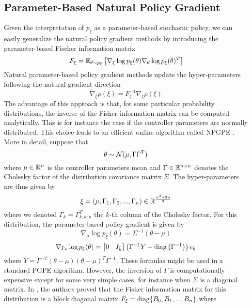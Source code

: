\subsection{Parameter-Based Natural Policy Gradient}
Given the interpretation of $p_\xi$ as a parameter-based stochastic policy, we can easily generalize the natural policy gradient methods by introducing the parameter-based Fischer information matrix
\begin{equation}
	F_\xi = \E[\theta\sim p_\xi]{\nabla_\xi\log p_\xi(\theta) \nabla_\theta\log p_\xi(\theta)^T}
\end{equation}
Natural parameter-based policy gradient methods update the hyper-parameters following the natural gradient direction 
\begin{equation}
	\widetilde{\nabla}_\xi \rho(\xi) = F_\xi^{-1} \nabla_\xi \rho(\xi)
\end{equation}
The advantage of this approach is that, for some particular probability distributions, the inverse of the Fisher information matrix can be computed analytically. This is for instance the case if the controller parameters are normally distributed. This choice leads to an efficient online algorithm called \gls{NPGPE} \cite{miyamae2010natural}. More in detail, suppose that
\begin{equation*}
	\theta \sim \calN(\mu, \Gamma \Gamma^T)
\end{equation*} 
where $\mu\in\R^n$ is the controller parameters mean and $\Gamma \in \R^{n\times n}$ denotes the Cholesky factor of the distribution covariance matrix $\Sigma$. The hyper-parameters are thus given by 
\begin{equation*}
	\xi = (\mu, \Gamma_1, \Gamma_2, ... , \Gamma_n) \in \R^\frac{n^2 + 3n}{2}
\end{equation*}
where we denoted $\Gamma_k = \Gamma_{k,k:n}^T$ the $k$-th column of the Cholesky factor. For this distribution, the parameter-based policy gradient is given by
\begin{equation}
	\nabla_\mu \log p_\xi(\theta) = \Sigma^{-1} (\theta - \mu)
\end{equation}
\begin{equation}
	\nabla_{\Gamma_k} \log p_\xi(\theta) = \begin{bmatrix} 0 & I_{\bar{k}} \end{bmatrix} \left(\Gamma^{-1} Y - \diag\left(\Gamma^{-1}\right)\right) e_k
\end{equation}
where $Y = \Gamma^{-T} (\theta - \mu) (\theta - \mu)^T \Gamma^{-1}$. These formulas might be used in a standard PGPE algorithm. However, the inversion of $\Gamma$ is computationally expensive except for some very simple cases, for instance when $\Sigma$ is a diagonal matrix. In \cite{sun2009efficient}, the authors proved that the Fisher information matrix for this distribution is a block diagonal matrix $F_\xi = \diag\{B_0, B_1, ..., B_n\}$ where
